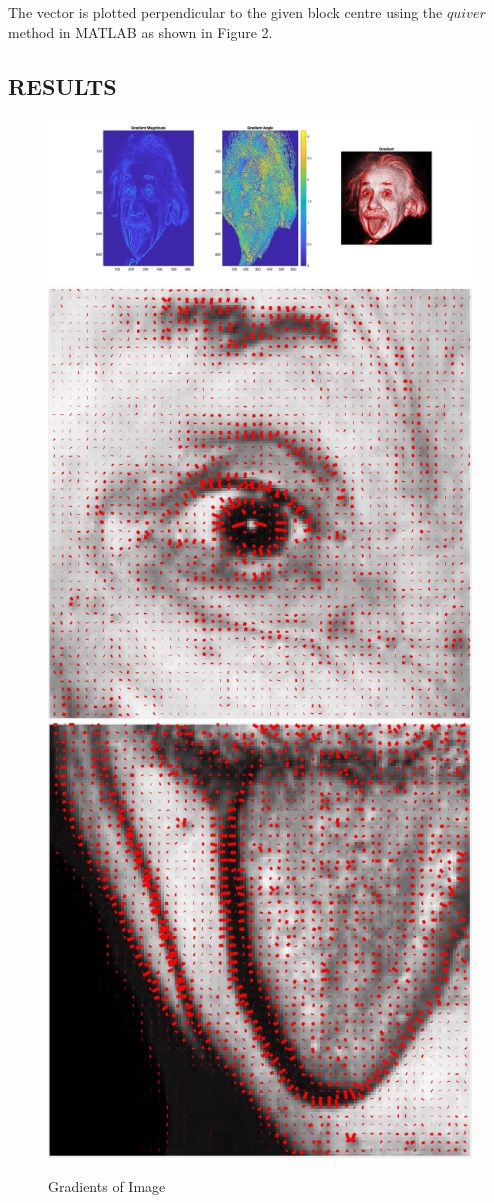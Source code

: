 \documentclass[letter, 10pt]{article}
\begin{document}
The vector is plotted perpendicular to the given block centre using the $quiver$ method in MATLAB as shown in Figure 2. 
\subsection*{RESULTS}
\begin{figure}[!h]
        \centering
        \includegraphics[width=\linewidth]{HW1/RESULT/GRADIENT.png}
    \endminipage\hfill
        \centering
        \includegraphics[width=0.7\linewidth]{HW1/RESULT/GRADIENT_EYE.png}
    \endminipage\hfill
        \centering
        \includegraphics[width=0.7\linewidth]{HW1/RESULT/GRADIENT_TONGUE.png}
    \endminipage\hfill
    \caption{Gradients of Image}
\end{figure}
\end{document}
